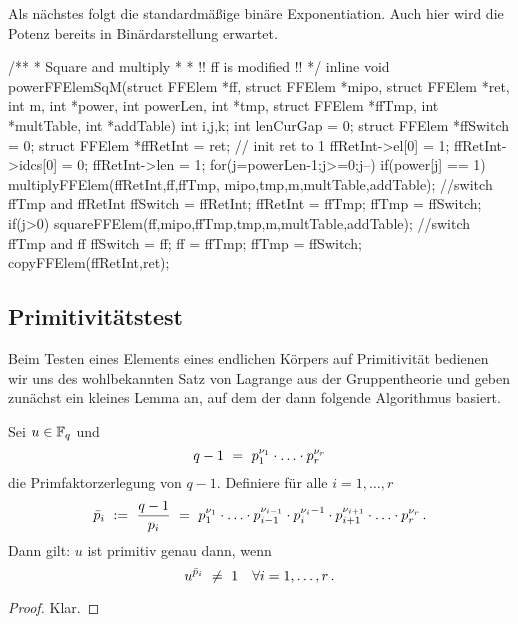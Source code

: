 Als nächstes folgt die standardmäßige binäre Exponentiation. Auch hier wird die
Potenz bereits in Binärdarstellung erwartet.

\begin{ccode}[caption={Aus \url{../Sage/enumeratePCNs.c}},
  label=lst:powerffelemsqm]
/**
 * Square and multiply
 *
 * !! ff is modified !!
 */
inline void powerFFElemSqM(struct FFElem *ff, struct FFElem *mipo,
        struct FFElem *ret, 
        int m, int *power, int powerLen,
        int *tmp, struct FFElem *ffTmp,
        int *multTable, int *addTable){
    int i,j,k;
    int lenCurGap = 0;
    struct FFElem *ffSwitch = 0;
    struct FFElem *ffRetInt = ret;
    // init ret to 1
    ffRetInt->el[0] = 1; ffRetInt->idcs[0] = 0; ffRetInt->len = 1;
    for(j=powerLen-1;j>=0;j--){
        if(power[j] == 1){
            multiplyFFElem(ffRetInt,ff,ffTmp, mipo,tmp,m,multTable,addTable);
            //switch ffTmp and ffRetInt
            ffSwitch = ffRetInt; ffRetInt = ffTmp; ffTmp = ffSwitch;
        }
        if(j>0){
            squareFFElem(ff,mipo,ffTmp,tmp,m,multTable,addTable);
            //switch ffTmp and ff
            ffSwitch = ff; ff = ffTmp; ffTmp = ffSwitch;
        }
    }
    copyFFElem(ffRetInt,ret);
}
\end{ccode}


\subsection{Primitivitätstest}
\label{subsub:primitivitaetstest}

Beim Testen eines Elements eines endlichen Körpers auf Primitivität bedienen
wir uns des wohlbekannten Satz von Lagrange aus der Gruppentheorie und geben
zunächst ein kleines Lemma an, auf dem der dann folgende Algorithmus basiert.

\begin{lemma}
  Sei $u \in \mathbb{F}_q$ und
  \[ q-1 \ =\  p_1^{\nu_1}\cdot\ldots\cdot p_r^{\nu_r}\]
  die Primfaktorzerlegung von $q-1$. Definiere
  für alle $i=1,\dots,r$
  \[ \bar p_i \ :=\   \frac{q-1}{p_i} \ =\ 
    p_1^{\nu_1}\cdot \ldots\cdot p_{i-1}^{\nu_{i-1}} \cdot
    p_i^{\nu_i-1}\cdot p_{i+1}^{\nu_{i+1}}\cdot\ldots\cdot p_r^{\nu_r}\,.\]
  Dann gilt: $u$ ist primitiv genau dann, wenn
  \[ u^{\bar p_i} \ \neq\  1\quad\forall i=1,\ldots,r \,.\]
\end{lemma}
\begin{proof}
  Klar.
\end{proof}

